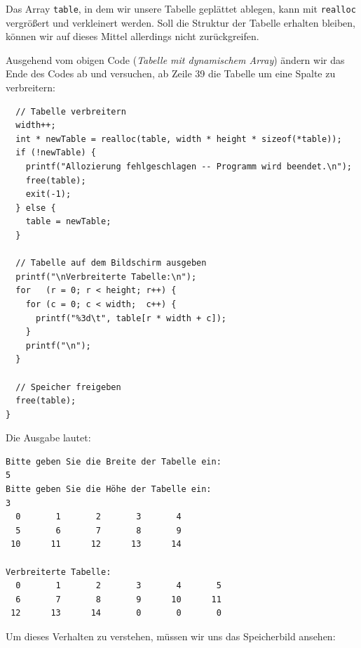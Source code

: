 Das Array \texttt{table}, in dem wir unsere Tabelle geplättet ablegen, kann mit \texttt{realloc} vergrößert und verkleinert werden. Soll die Struktur der Tabelle erhalten bleiben, können wir auf dieses Mittel allerdings nicht zurückgreifen.

Ausgehend vom obigen Code (\emph{Tabelle mit dynamischem Array}) ändern wir das Ende des Codes ab und versuchen, ab Zeile 39 die Tabelle um eine Spalte zu verbreitern:

\begin{warnbox}[Beispiel: Tabelle vergrößern mit dynamischem Array -- (fehlerhafter Code),leftupper=7mm]
\begin{verbatim}
  // Tabelle verbreitern
  width++;
  int * newTable = realloc(table, width * height * sizeof(*table));
  if (!newTable) {
    printf("Allozierung fehlgeschlagen -- Programm wird beendet.\n");
    free(table);
    exit(-1);
  } else {
    table = newTable;
  }

  // Tabelle auf dem Bildschirm ausgeben
  printf("\nVerbreiterte Tabelle:\n");
  for   (r = 0; r < height; r++) {
    for (c = 0; c < width;  c++) {
      printf("%3d\t", table[r * width + c]);
    }
    printf("\n");
  }

  // Speicher freigeben
  free(table);
}
\end{verbatim}
\end{warnbox}

Die Ausgabe lautet:

\begin{cmdbox}
\begin{verbatim}
Bitte geben Sie die Breite der Tabelle ein:
5
Bitte geben Sie die Höhe der Tabelle ein:
3
  0       1       2       3       4
  5       6       7       8       9
 10      11      12      13      14

Verbreiterte Tabelle:
  0       1       2       3       4       5
  6       7       8       9      10      11
 12      13      14       0       0       0

\end{verbatim}
\end{cmdbox}

Um dieses Verhalten zu verstehen, müssen wir uns das Speicherbild ansehen:

